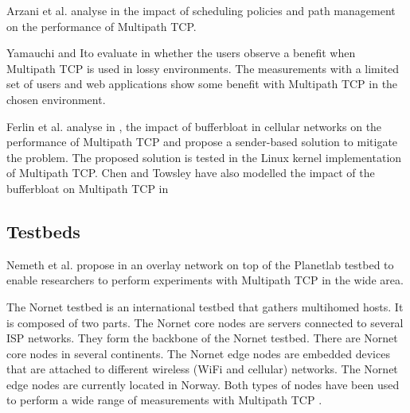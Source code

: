 Arzani et al. analyse in \cite{Arzani_Impact:2014} the impact of scheduling policies and path management on the performance of Multipath TCP. 

Yamauchi and Ito evaluate in \cite{Yamauchi_Web:2014} whether the users observe a benefit when Multipath TCP is used in lossy environments. The measurements with a limited set of users and web applications show some benefit with Multipath TCP in the chosen environment.

Ferlin et al. analyse in \cite{Ferlin_Bufferbloat:2014}, the impact of bufferbloat in cellular networks on the performance of Multipath TCP and propose a sender-based solution to mitigate the problem. The proposed solution is tested in the Linux kernel implementation of Multipath TCP. Chen and Towsley have also modelled the impact of the bufferbloat on Multipath TCP in \cite{Chen_Bufferbloat:2014}

\subsection{Testbeds}

Nemeth et al. propose in \cite{Nemeth_Playground:2013} an overlay network on top of the Planetlab testbed to enable researchers to perform experiments with Multipath TCP in the wide area. 


The Nornet testbed \cite{Gunnar_Nornet:2014,Kvalbein_Nornet:2014} is an international testbed that gathers multihomed hosts. It is composed of two parts. The Nornet core nodes \cite{Gunnar_Nornet:2014} are servers connected to several ISP networks. They form the backbone of the Nornet testbed. There are Nornet core nodes in several continents. The Nornet edge nodes \cite{Kvalbein_Nornet:2014} are embedded devices that are attached to different wireless (WiFi and cellular) networks. The Nornet edge nodes are currently located in Norway. Both types of nodes have been used to perform a wide range of measurements with Multipath TCP \cite{draft-dreibholz-mptcp-nornet-experience}.
